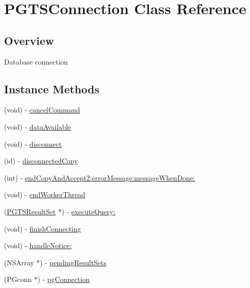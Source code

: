 \hypertarget{interface_p_g_t_s_connection}{}\section{P\+G\+T\+S\+Connection Class Reference}
\label{interface_p_g_t_s_connection}


\subsection{Overview}
Database connection \subsection*{Instance Methods}
\begin{DoxyCompactItemize}
\item 
(void) -\/ \hyperlink{interface_p_g_t_s_connection_a5c96541d27baa27effc4c41a34c6f7b5}{cancel\+Command}
\item 
(void) -\/ \hyperlink{interface_p_g_t_s_connection_aa35c527c945c44fb1b3e54e4f60b2bc5}{data\+Available}
\item 
(void) -\/ \hyperlink{interface_p_g_t_s_connection_ac27d9a922212bbb839b97d771ab9d0ed}{disconnect}
\item 
(id) -\/ \hyperlink{interface_p_g_t_s_connection_a52160e873f74b6210c8ca6eaf24f9dde}{disconnected\+Copy}
\item 
(int) -\/ \hyperlink{interface_p_g_t_s_connection_af80b6820e2e507e803f2f011bbae3c99}{end\+Copy\+And\+Accept2\+:error\+Message\+:message\+When\+Done\+:}
\item 
(void) -\/ \hyperlink{interface_p_g_t_s_connection_a64b839f08f374d331eca7694d69fb9fd}{end\+Worker\+Thread}
\item 
(\hyperlink{interface_p_g_t_s_result_set}{P\+G\+T\+S\+Result\+Set} $\ast$) -\/ \hyperlink{interface_p_g_t_s_connection_ac19b3e31f8fe98a5489da54a4564d4ba}{execute\+Query\+:}
\item 
(void) -\/ \hyperlink{interface_p_g_t_s_connection_ac59a750fd88dfad5ecba3cb05ae5b6c2}{finish\+Connecting}
\item 
(void) -\/ \hyperlink{interface_p_g_t_s_connection_a3d8e6f87bc1984254edefb37161179f8}{handle\+Notice\+:}
\item 
(N\+S\+Array $\ast$) -\/ \hyperlink{interface_p_g_t_s_connection_a197a23fee041660cbacb5398d1eb46ed}{pending\+Result\+Sets}
\item 
(P\+Gconn $\ast$) -\/ \hyperlink{interface_p_g_t_s_connection_ad108477786f1061133b1acb7bf10b3b5}{pg\+Connection}

\end{DoxyCompactItemize}
